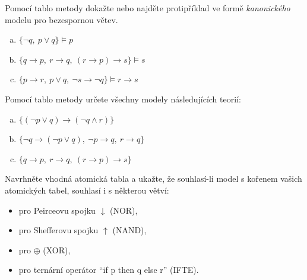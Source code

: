 \documentclass[a4paper,11pt]{amsart}
\begin{document}
\begin{problem}
    
    Pomocí tablo metody dokažte nebo najděte protipříklad ve formě \emph{kanonického} modelu pro bezespornou větev.
    \begin{enumerate}[(a)]
        \item $\{ \neg q,\ p \vee q\} \models p$
        \item $\{ q \to p,\ r \to q,\ (r \to p) \to s\} \models s$
        \item $\{ p \to r,\ p \vee q,\ \neg s \to \neg q\} \models r \to s$
    \end{enumerate}

\end{problem}


\begin{problem}

    Pomocí tablo metody určete všechny modely následujících teorií:
    \begin{enumerate}[(a)]
        \item $\{(\neg p \vee q) \to (\neg q \wedge r)\}$
        \item $\{\neg q \to (\neg p \vee q),\ \neg p \to q,\ r \to q\}$
        \item $\{ q \to p,\ r \to q,\ (r \to p) \to s\}$
    \end{enumerate}

\end{problem}


\begin{problem} 
    Navrhněte vhodná atomická tabla a ukažte, že souhlasí-li model s kořenem vašich atomických tabel, souhlasí i s některou větví:
    \begin{itemize}
        \item pro Peirceovu spojku $\downarrow$ (NOR),
        \item pro Shefferovu spojku $\uparrow$ (NAND),
        \item pro $\oplus$ (XOR),
        \item pro ternární operátor ``if p then q else r'' (IFTE).
    \end{itemize}  
    
\end{problem}
\end{document}
